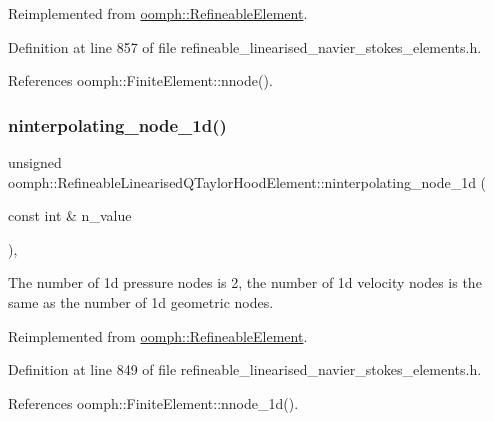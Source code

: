 Reimplemented from \hyperlink{classoomph_1_1RefineableElement_a8b1b5031b55141567ba24913a21534f4}{oomph\+::\+Refineable\+Element}.



Definition at line 857 of file refineable\+\_\+linearised\+\_\+navier\+\_\+stokes\+\_\+elements.\+h.



References oomph\+::\+Finite\+Element\+::nnode().

\mbox{\label{classoomph_1_1RefineableLinearisedQTaylorHoodElement_ad9f71c10f18b87bd43ade29ba9741665}} 
\subsubsection{\texorpdfstring{ninterpolating\+\_\+node\+\_\+1d()}{ninterpolating\_node\_1d()}}
{\footnotesize\ttfamily unsigned oomph\+::\+Refineable\+Linearised\+Q\+Taylor\+Hood\+Element\+::ninterpolating\+\_\+node\+\_\+1d (\begin{DoxyParamCaption}\item[{const int \&}]{n\+\_\+value }\end{DoxyParamCaption})\hspace{0.3cm}{\ttfamily [inline]}, {\ttfamily [virtual]}}



The number of 1d pressure nodes is 2, the number of 1d velocity nodes is the same as the number of 1d geometric nodes. 



Reimplemented from \hyperlink{classoomph_1_1RefineableElement_a850180084aaf164550b4f4978b42cda7}{oomph\+::\+Refineable\+Element}.



Definition at line 849 of file refineable\+\_\+linearised\+\_\+navier\+\_\+stokes\+\_\+elements.\+h.



References oomph\+::\+Finite\+Element\+::nnode\+\_\+1d().

\mbox{\label{classoomph_1_1RefineableLinearisedQTaylorHoodElement_a086b235ae15bc49e1043ae6f09217ae9}} 
